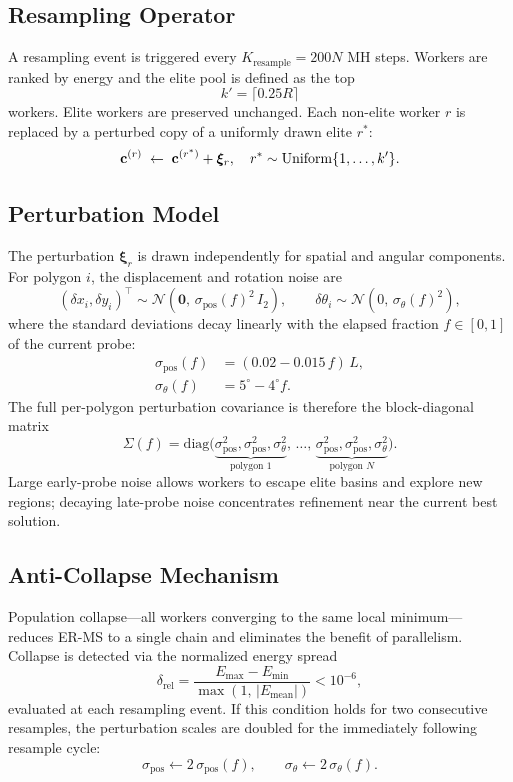 \subsection{Resampling Operator}

A resampling event is triggered every
$K_{\mathrm{resample}} = 200N$ MH steps.
Workers are ranked by energy and the elite pool is defined as the top
\[
  k' = \lceil 0.25 R \rceil
\]
workers. Elite workers are preserved unchanged. Each non-elite worker $r$
is replaced by a perturbed copy of a uniformly drawn elite $r^*$:
\[
  \mathbf{c}^{(r)} \;\leftarrow\; \mathbf{c}^{(r^*)} + \bm{\xi}_r,
  \quad
  r^* \sim \mathrm{Uniform}\{1, \dots, k'\}.
\]

\subsection{Perturbation Model}

The perturbation $\bm{\xi}_r$ is drawn independently for spatial and
angular components.
For polygon $i$, the displacement and rotation noise are
\[
  (\delta x_i, \delta y_i)^\top \sim \mathcal{N}\!\left(\mathbf{0},\,
    \sigma_{\mathrm{pos}}(f)^2\, I_2\right),
  \qquad
  \delta\theta_i \sim \mathcal{N}\!\left(0,\, \sigma_\theta(f)^2\right),
\]
where the standard deviations decay linearly with the elapsed fraction
$f \in [0,1]$ of the current probe:
\begin{align}
  \sigma_{\mathrm{pos}}(f) &= (0.02 - 0.015\,f)\,L, \\
  \sigma_\theta(f) &= 5^\circ - 4^\circ f.
\end{align}
The full per-polygon perturbation covariance is therefore the block-diagonal matrix
\[
  \Sigma(f) = \mathrm{diag}\!\bigl(
    \underbrace{\sigma_{\mathrm{pos}}^2, \sigma_{\mathrm{pos}}^2,
    \sigma_\theta^2}_{\text{polygon }1},\,
    \dots,\,
    \underbrace{\sigma_{\mathrm{pos}}^2, \sigma_{\mathrm{pos}}^2,
    \sigma_\theta^2}_{\text{polygon }N}
  \bigr).
\]
Large early-probe noise allows workers to escape elite basins
and explore new regions; decaying late-probe noise concentrates
refinement near the current best solution.

\subsection{Anti-Collapse Mechanism}

Population collapse---all workers converging to the same local minimum---
reduces ER-MS to a single chain and eliminates the benefit of
parallelism. Collapse is detected via the normalized energy spread
\[
  \delta_{\mathrm{rel}}
  = \frac{E_{\max} - E_{\min}}{\max\!\left(1,\, \lvert E_{\mathrm{mean}}\rvert\right)}
  < 10^{-6},
\]
evaluated at each resampling event.
If this condition holds for two consecutive resamples, the perturbation
scales are doubled for the immediately following resample cycle:
\[
  \sigma_{\mathrm{pos}} \leftarrow 2\,\sigma_{\mathrm{pos}}(f), \qquad
  \sigma_\theta \leftarrow 2\,\sigma_\theta(f).
\]

